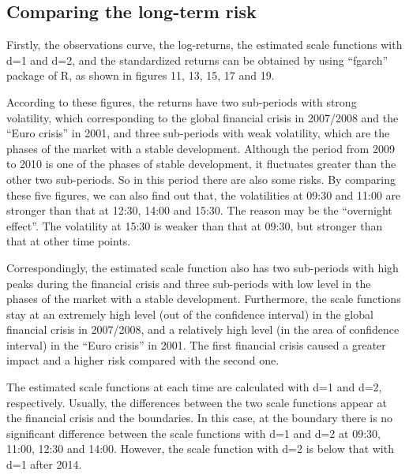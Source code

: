 \subsection{Comparing the long-term risk}

Firstly, the observations curve, the log-returns, the estimated scale functions with d=1 and d=2, and the standardized returns can be obtained by using ``fgarch'' package of R, as shown in figures 11, 13, 15, 17 and 19.

According to these figures, the returns have two sub-periods with strong volatility, which corresponding to the global financial crisis in 2007/2008 and the ``Euro crisis'' in 2001, and three sub-periods with weak volatility, which are the phases of the market with a stable development. Although the period from 2009 to 2010 is one of the phases of stable development, it fluctuates greater than the other two sub-periods. So in this period there are also some risks. By comparing these five figures, we can also find out that, the volatilities at 09:30 and 11:00 are stronger than that at 12:30, 14:00 and 15:30. The reason may be the ``overnight effect''. The volatility at 15:30 is weaker than that at 09:30, but stronger than that at other time points.

Correspondingly, the estimated scale function also has two sub-periods with high peaks during the financial crisis and three sub-periods with low level in the phases of the market with a stable development. Furthermore, the scale functions stay at an extremely high level (out of the confidence interval) in the global financial crisis in 2007/2008, and a relatively high level (in the area of confidence interval) in the ``Euro crisis'' in 2001. The first financial crisis caused a greater impact and a higher risk compared with the second one. 

The estimated scale functions at each time are calculated with d=1 and d=2, respectively. Usually, the differences between the two scale functions appear at the financial crisis and the boundaries. In this case, at the boundary there is no significant difference between the scale functions with d=1 and d=2 at 09:30, 11:00, 12:30 and 14:00. However, the scale function with d=2 is below that with d=1 after 2014. 

